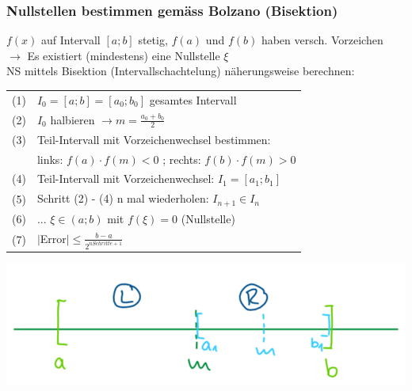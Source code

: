 		\subsubsection{Nullstellen bestimmen gemäss Bolzano (Bisektion)}
			$f(x)$ auf Intervall $[a;b]$ stetig, $f(a)$ und $f(b)$ haben versch. Vorzeichen \\
			$\rightarrow$ Es existiert (mindestens) eine 	Nullstelle $\xi$\\	
			NS mittels Bisektion (Intervallschachtelung) näherungsweise berechnen: \\
			
			\begin{tabular}{ll}
				(1) & $I_0 = [a ; b] = [a_0 ; b_0]$ gesamtes Intervall \\
				(2) & $I_0$ halbieren $\rightarrow m = \frac{a_0 + b_0}{2}$ \\
				(3) & Teil-Intervall mit Vorzeichenwechsel bestimmen: \\
				    & links: $f(a) \cdot f(m) < 0$ ; rechts: $f(b) \cdot f(m) > 0$ \\
				(4) & Teil-Intervall mit Vorzeichenwechsel: $I_1 = [a_1 ; b_1]$ \\
				(5) & Schritt (2) - (4) n mal wiederholen: $I_{n+1} \in I_n$ \\
				(6) & ... $\xi \in (a;b)$ mit $f(\xi) = 0$ (Nullstelle) \\
				(7) & $ \vert $Error$ \vert \leq \frac{b-a}{2^{n Schritte + 1}} $ \\
			\end{tabular}						
				
			\includegraphics[width=0.9\linewidth]{Bilder/bisektion}
		
